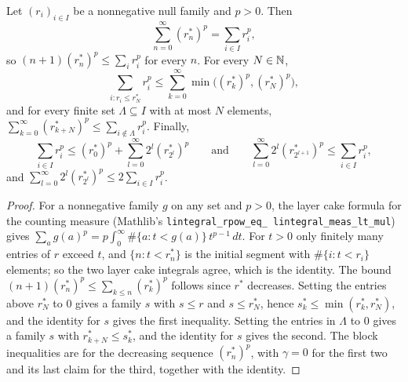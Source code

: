\begin{lemma}
\label{lem:decreasing-rearrangement-blocks}
\leanok
{}
Let $(r_i)_{i \in I}$ be a nonnegative null family and $p > 0$. Then
\[
  \sum_{n=0}^\infty (r^*_n)^p = \sum_{i \in I} r_i^p ,
\]
so $(n + 1)(r^*_n)^p \leq \sum_i r_i^p$ for every $n$. For every $N \in \mathbb{N}$,
\[
  \sum_{i : r_i \leq r^*_N} r_i^p \leq \sum_{k=0}^\infty \min\bigl((r^*_k)^p, (r^*_N)^p\bigr),
\]
and for every finite set $\Lambda \subseteq I$ with at most $N$ elements,
$\sum_{k=0}^\infty (r^*_{k+N})^p \leq \sum_{i \notin \Lambda} r_i^p$. Finally,
\[
  \sum_{i \in I} r_i^p \leq (r^*_0)^p + \sum_{l=0}^\infty 2^l (r^*_{2^l})^p
  \qquad \text{and} \qquad
  \sum_{l=0}^\infty 2^l (r^*_{2^{l+1}})^p \leq \sum_{i \in I} r_i^p ,
\]
and $\sum_{l=0}^\infty 2^l (r^*_{2^l})^p \leq 2 \sum_{i \in I} r_i^p$.
\end{lemma}

\begin{proof}
\leanok
For a nonnegative family $g$ on any set and $p > 0$, the layer cake formula for the counting
measure (Mathlib's \texttt{lintegral\_\allowbreak rpow\_\allowbreak eq\_\allowbreak
lintegral\_\allowbreak meas\_\allowbreak lt\_\allowbreak mul}) gives
$\sum_a g(a)^p = p \int_0^\infty \#\{a : t < g(a)\} \, t^{p-1} \, dt$. For $t > 0$ only
finitely many entries of $r$ exceed $t$, and $\{n : t < r^*_n\}$ is the initial segment with
$\#\{i : t < r_i\}$ elements; so the two layer cake integrals agree, which is the identity.
The bound $(n + 1)(r^*_n)^p \leq \sum_{k \leq n} (r^*_k)^p$ follows since $r^*$ decreases.
Setting the entries above $r^*_N$ to $0$ gives a family $s$ with $s \leq r$ and
$s \leq r^*_N$, hence $s^*_k \leq \min(r^*_k, r^*_N)$, and the identity for $s$ gives the
first inequality. Setting the entries in $\Lambda$ to $0$ gives a family $s$ with
$r^*_{k+N} \leq s^*_k$, and the identity for $s$ gives the second. The block inequalities are
 for the decreasing sequence $(r^*_n)^p$, with $\gamma = 0$ for the
first two and its last claim for the third, together with the identity.
\end{proof}

